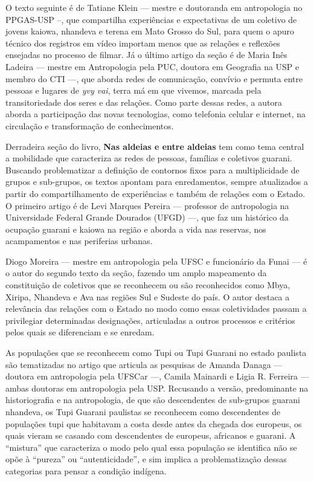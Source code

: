 O texto seguinte é de Tatiane Klein --- mestre e doutoranda em
antropologia no PPGAS-USP --, que compartilha experiências e
expectativas de um coletivo de jovens kaiowa, nhandeva e terena em Mato
Grosso do Sul, para quem o apuro técnico dos registros em vídeo importam
menos que as relações e reflexões ensejadas no processo de filmar. Já o
último artigo da seção é de Maria Inês Ladeira --- mestre em
Antropologia pela PUC, doutora em Geografia na USP e membro do CTI ---,
que aborda redes de comunicação, convívio e permuta entre pessoas e
lugares de \emph{yvy vai}, terra má em que vivemos, marcada pela
transitoriedade dos seres e das relações. Como parte dessas redes, a
autora aborda a participação das novas tecnologias, como telefonia
celular e internet, na circulação e transformação de conhecimentos.

Derradeira seção do livro, \textbf{Nas aldeias e entre aldeias} tem como
tema central a mobilidade que caracteriza as redes de pessoas, famílias
e coletivos guarani. Buscando problematizar a definição de contornos
fixos para a multiplicidade de grupos e sub-grupos, os textos apontam
para enredamentos, sempre atualizados a partir do compartilhamento de
experiências e também de relações com o Estado. O primeiro artigo é de
Levi Marques Pereira --- professor de antropologia na Universidade
Federal Grande Dourados (UFGD) ---, que faz um histórico da ocupação
guarani e kaiowa na região e aborda a vida nas reservas, nos
acampamentos e nas periferias urbanas.

Diogo Moreira --- mestre em antropologia pela UFSC e funcionário da
Funai --- é o autor do segundo texto da seção, fazendo um amplo
mapeamento da constituição de coletivos que se reconhecem ou são
reconhecidos como Mbya, Xiripa, Nhandeva e Ava nas regiões Sul e Sudeste
do país. O autor destaca a relevância das relações com o Estado no modo
como essas coletividades passam a privilegiar determinadas designações,
articuladas a outros processos e critérios pelos quais se diferenciam e
se enredam.

As populações que se reconhecem como Tupi ou Tupi Guarani no estado
paulista são tematizadas no artigo que articula as pesquisas de Amanda
Danaga --- doutora em antropologia pela UFSCar ---, Camila Mainardi e
Ligia R. Ferreira --- ambas doutoras em antropologia pela USP. Recusando
a versão, predominante na historiografia e na antropologia, de que são
descendentes de sub-grupos guarani nhandeva, os Tupi Guarani paulistas
se reconhecem como descendentes de populações tupi que habitavam a costa
desde antes da chegada dos europeus, os quais vieram se casando com
descendentes de europeus, africanos e guarani. A ``mistura'' que
caracteriza o modo pelo qual essa população se identifica não se opõe à
``pureza'' ou ``autenticidade'', e sim implica a problematização dessas
categorias para pensar a condição indígena.

